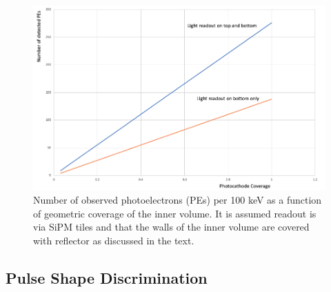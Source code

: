 \documentclass[a4paper,11pt]{article}
\begin{document}
\begin{figure}[ht]
\begin{centering}
\includegraphics[width=0.90\columnwidth]{Figures/PE_Coverage.png}
\par\end{centering}
\caption{Number of observed photoelectrons (PEs) per 100 keV as a function of geometric coverage of the inner volume. It is assumed readout is via SiPM tiles and that the walls of the inner volume are covered with reflector as discussed in the text. \label{fig:pecoverage}}
\end{figure}


\subsection{Pulse Shape Discrimination}\label{sec:psd_calc}
\end{document}
